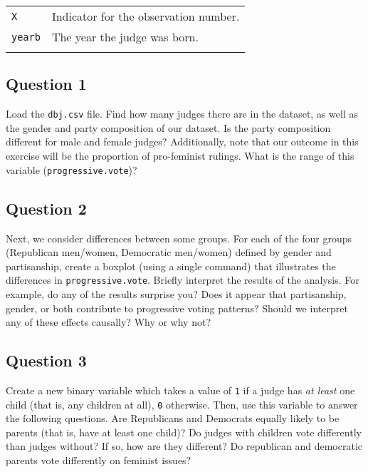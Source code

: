 \documentclass[]{article}
\begin{document}
\begin{longtable}[c]{@{}ll@{}}
\begin{minipage}[t]{0.34\columnwidth}
\texttt{X}
\end{minipage} & \begin{minipage}[t]{0.59\columnwidth}\raggedright
Indicator for the observation number.
\end{minipage}
\\\addlinespace
\begin{minipage}[t]{0.34\columnwidth}\raggedright
\texttt{yearb}
\end{minipage} & \begin{minipage}[t]{0.59\columnwidth}\raggedright
The year the judge was born.
\end{minipage}
\\\addlinespace
\bottomrule
\end{longtable}

\subsection{Question 1}\label{question-1}

Load the \texttt{dbj.csv} file. Find how many judges there are in the
dataset, as well as the gender and party composition of our dataset. Is
the party composition different for male and female judges?
Additionally, note that our outcome in this exercise will be the
proportion of pro-feminist rulings. What is the range of this variable
(\texttt{progressive.vote})?

\subsection{Question 2}\label{question-2}

Next, we consider differences between some groups. For each of the four
groups (Republican men/women, Democratic men/women) defined by gender
and partisanship, create a boxplot (using a single command) that
illustrates the differences in \texttt{progressive.vote}. Briefly
interpret the results of the analysis. For example, do any of the
results surprise you? Does it appear that partisanship, gender, or both
contribute to progressive voting patterns? Should we interpret any of
these effects causally? Why or why not?

\subsection{Question 3}\label{question-3}

Create a new binary variable which takes a value of \texttt{1} if a
judge has \emph{at least} one child (that is, any children at all),
\texttt{0} otherwise. Then, use this variable to answer the following
questions. Are Republicans and Democrats equally likely to be parents
(that is, have at least one child)? Do judges with children vote
differently than judges without? If so, how are they different? Do
republican and democratic parents vote differently on feminist issues?
\end{document}
